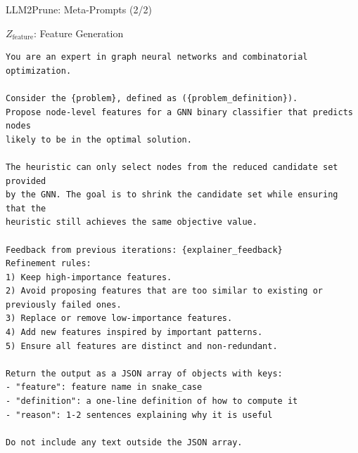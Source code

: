 \documentclass[aspectratio=169,xcolor=dvipsnames,8pt]{beamer}
\begin{document}
\begin{frame}[fragile]{LLM2Prune: Meta-Prompts (2/2)}
  \begin{block}{$Z_{\text{feature}}$: Feature Generation}
    \begin{verbatim}
You are an expert in graph neural networks and combinatorial optimization.

Consider the {problem}, defined as ({problem_definition}).
Propose node-level features for a GNN binary classifier that predicts nodes
likely to be in the optimal solution.

The heuristic can only select nodes from the reduced candidate set provided
by the GNN. The goal is to shrink the candidate set while ensuring that the
heuristic still achieves the same objective value.

Feedback from previous iterations: {explainer_feedback}
Refinement rules:
1) Keep high-importance features.
2) Avoid proposing features that are too similar to existing or previously failed ones.
3) Replace or remove low-importance features.
4) Add new features inspired by important patterns.
5) Ensure all features are distinct and non-redundant.

Return the output as a JSON array of objects with keys:
- "feature": feature name in snake_case
- "definition": a one-line definition of how to compute it
- "reason": 1-2 sentences explaining why it is useful

Do not include any text outside the JSON array.
    \end{verbatim}
  \end{block}
\end{frame}
\end{document}
